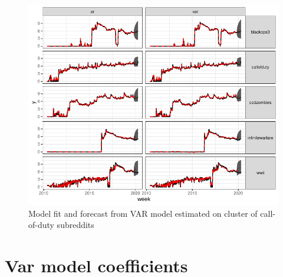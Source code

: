 \documentclass[manuscript]{acmart}\usepackage[]{graphicx}\usepackage[]{color}
\makeatletter
\def\maxwidth{ %
  \ifdim\Gin@nat@width>\linewidth
    \linewidth
  \else
    \Gin@nat@width
  \fi
}
\makeatother
\begin{document}
\begin{figure}
\centering

\includegraphics[width=\maxwidth]{figures/knitr-void_fcast-1} 

\caption{Model fit and forecast from VAR model estimated on cluster of call-of-duty subreddits} 
\end{figure}

\clearpage
\section{Var model coefficients}
\end{document}
